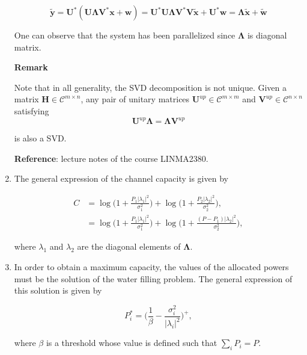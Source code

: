 \documentclass [a4paper, 11pt] {article}
\begin{document}
\begin{solution}
\begin{enumerate}
        \begin{equation} \mathbf{\tilde{y}} = \mathbf{U}^*(\mathbf{U}\mathbf{\Lambda}\mathbf{V}^*\mathbf{x} + \mathbf{w} ) = \mathbf{U}^*\mathbf{U}\mathbf{\Lambda}\mathbf{V}^*\mathbf{V}\mathbf{\tilde{x}} + \mathbf{U}^*\mathbf{w} = \mathbf{\Lambda} \mathbf{\tilde{x}} + \mathbf{\tilde{w}}
        \end{equation}

        One can observe that the system has been parallelized since $\mathbf{\Lambda}$ is diagonal matrix.


        \textbf{Remark}


        Note that in all generality, the SVD decomposition is not unique. Given a matrix $\mathbf{H} \in \mathcal{C}^{m \times n}$, any pair of unitary matrices $\mathbf{U}^{up} \in \mathcal{C}^{m \times m}$ and $\mathbf{V}^{up} \in \mathcal{C}^{n \times n}$ satisfying
        \begin{equation}\mathbf{U}^{up}\mathbf{\Lambda}= \mathbf{\Lambda}\mathbf{V}^{up}\end{equation}

        is also a SVD.

        \textbf{Reference}: lecture notes of the course LINMA2380.

        \item The general expression of the channel capacity is given by

        \begin{align}
         C &= \log\bigg(1 + \frac{P_1|\lambda_1|^2}{\sigma_1^2}\bigg) + \log\bigg(1 + \frac{P_2|\lambda_2|^2}{\sigma_2^2}\bigg), \\
         &= \log\bigg(1 + \frac{P_1|\lambda_1|^2}{\sigma_1^2}\bigg) + \log\bigg(1 + \frac{(P-P_1)|\lambda_2|^2}{\sigma_2^2}\bigg),
        \end{align}

        where $\lambda_1$ and $\lambda_2$ are the diagonal elements of $\mathbf{\Lambda}$.

        \item In order to obtain a maximum capacity, the values of the allocated powers must be the solution of the water filling problem. The general expression of this solution is given by

        \begin{equation}P_i^* = \bigg(\frac{1}{\beta}-\frac{\sigma_i^2}{|\lambda_i|^2}\bigg)^+,
        \end{equation}

        where $\beta$ is a threshold whose value is defined such that $\sum_i P_i = P$.


\end{enumerate}
\end{solution}
\end{document}
